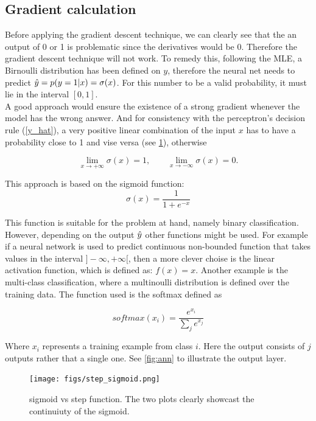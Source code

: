 \subsection{Gradient calculation}\label{sec:cal_gradient}

Before applying the gradient descent technique, we can clearly see that the an output of 0 or 1 is problematic since the derivatives would be 0. Therefore the gradient descent technique will not work. To remedy this, following the MLE, a Birnoulli distribution has been defined on $y$, therefore the neural net needs to predict $\hat{y} = p(y = 1 | x) = \sigma (x)$. For this number to be a valid probability, it must lie in the interval $[0, 1]$. \\
A good approach would ensure the existence of a strong gradient whenever the model has the wrong answer. And for consistency with the perceptron's decision rule (\cref{y_hat}), a very positive linear combination of the input $x$ has to have a probability close to 1 and vise versa (see \cref{fig:step_sigmoid}), otherwise

\begin{equation}
  \label{equ:limits}
  \lim_{x \rightarrow +\infty} \sigma(x) = 1, \qquad \lim_{x \rightarrow -\infty} \sigma(x) = 0.
\end{equation}

This approach is based on the sigmoid function:
 $$
 \sigma(x) = \frac{1}{1 + e^{-x}}
 $$

This function is suitable for the problem at hand, namely binary classification. However, depending on the output $\hat{y}$ other functions might be used. For example if a neural network is used to predict continuous non-bounded function that takes values in the interval $]-\infty, +\infty[$, then a more clever choise is the linear activation function, which is defined as: $f(x) = x$. Another example is the multi-class classification, where a multinoulli distribution is defined over the training data. The function used is the softmax defined as

$$
softmax(x_i) = \frac{e^{x_i}}{\sum_j e^{x_j}}
$$

Where $x_i$ represents a training example from class $i$. Here the output consists of $j$ outputs rather that a single one. See \cref{fig:ann} to illustrate the output layer.

\begin{figure}[!htpb]
  \centering
  \texttt{[image: figs/step\_sigmoid.png]}
  \caption{sigmoid vs step function. The two plots clearly showcast the continuiuty of the sigmoid.}\label{fig:step_sigmoid}
\end{figure}

